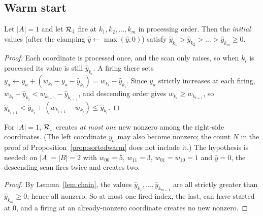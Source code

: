\subsection{Warm start}

\begin{lemma}\label{lem:chain}
Let $|A| = 1$ and let $\mathcal{R}_\downarrow$ fire at $k_1, k_2, \dots, k_m$ in processing order. Then
the \emph{initial} values (after the clamping $\hat{y} \leftarrow \max(\hat{y},0)$) satisfy
$\hat{y}_{k_1} > \hat{y}_{k_2} > \dots > \hat{y}_{k_m} \ge 0$.
\end{lemma}
\begin{proof}
Each coordinate is processed once, and the scan only raises, so when $k_i$ is processed its value is
still $\hat{y}_{k_i}$. A firing there sets
$y_a \leftarrow y_a + (w_{k_i} - y_a - \hat{y}_{k_i}) = w_{k_i} - \hat{y}_{k_i}$.
Since $y_a$ strictly increases at each firing,
$w_{k_i} - \hat{y}_{k_i} < w_{k_{i+1}} - \hat{y}_{k_{i+1}}$, and descending order gives
$w_{k_i} \ge w_{k_{i+1}}$, so
$\hat{y}_{k_{i+1}} < \hat{y}_{k_i} + (w_{k_{i+1}} - w_{k_i}) \le \hat{y}_{k_i}$.
\end{proof}

\begin{corollary}\label{cor:onenew}
For $|A| = 1$, $\mathcal{R}_\downarrow$ creates \emph{at most one} new nonzero among the right-side
coordinates. (The left coordinate $y_a$ may also become nonzero; the count $N$ in the proof of
Proposition~\ref{prop:sortedwarm} does not include it.) The hypothesis is needed: on
$|A| = |B| = 2$ with $w_{00} = 5$, $w_{11} = 3$, $w_{01} = w_{10} = 1$ and $\hat y = 0$, the
descending scan fires twice and creates two.
\end{corollary}
\begin{proof}
By Lemma~\ref{lem:chain}, the values $\hat{y}_{k_1}, \dots, \hat{y}_{k_{m-1}}$ are all strictly
greater than $\hat{y}_{k_m} \ge 0$, hence all nonzero. So at most one fired index, the last,
can have started at $0$, and a firing at an already-nonzero coordinate creates no new nonzero.
\end{proof}

